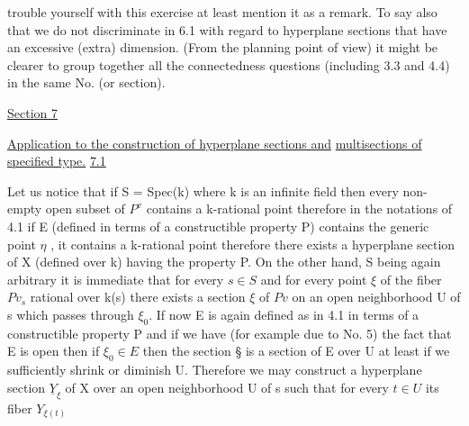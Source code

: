 
trouble yourself with this exercise at least mention it as a
remark.  To say also that we do not discriminate in 6.1 with
regard to hyperplane sections that have an excessive (extra)
dimension.
(From the planning point of view) it might be clearer to group
together all the connectedness questions (including 3.3 and 4.4)
in the same No. (or section).

\uline{Section 7}

\uline{Application to the construction of hyperplane sections and}
\uline{multisections of specified type.}
\uline{7.1}

Let us notice that if S = Spec(k) where  k  is an infinite
field then every non-empty open subset of $P^{v}$ contains a k-rational
point therefore in the notations of 4.1 if E (defined in terms of
a constructible property P) contains the generic point $\eta$ , it
contains a k-rational point therefore there exists a hyperplane
section of X (defined over k) having the property P. On the other
hand, S being again arbitrary it is immediate that for every $s\in S$
and for every point $\xi$ of the fiber $Pv_{s}$ rational over k(s) there
exists a section $\xi$ of $Pv$ on an open neighborhood U of s which
passes through $\xi_{0}$.  If now E is again defined as in 4.1 in terms of
a constructible property P and if we have (for example due to No.
5) the fact that E is open then if $\xi_{0} \in E$ then the section \S{} is a
section of E over U at least if we sufficiently shrink or diminish
U.  Therefore we may construct a hyperplane section $\underline{Y}_{\xi}$ of X over an
open neighborhood U of s such that for every $t \in U$ its fiber $Y_{\xi(t)}$
